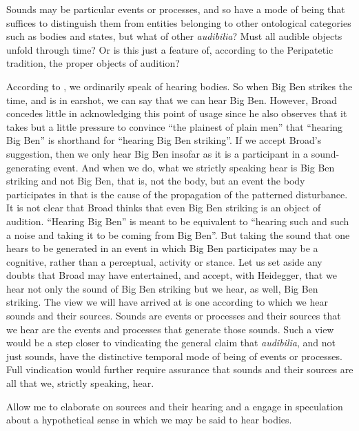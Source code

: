 Sounds may be particular events or processes, and so have a mode of being that suffices to distinguish them from entities belonging to other ontological categories such as bodies and states, but what of other \emph{audibilia}? Must all audible objects unfold through time? Or is this just a feature of, according to the Peripatetic tradition, the proper objects of audition? 

According to \citet[4]{Broad:1952kx}, we ordinarily speak of hearing bodies. So when Big Ben strikes the time, and is in earshot, we can say that we can hear Big Ben. However, Broad concedes little in acknowledging this point of usage since he also observes that it takes but a little pressure to convince ``the plainest of plain men'' that ``hearing Big Ben'' is shorthand for ``hearing Big Ben striking''. If we accept Broad's suggestion, then we only hear Big Ben insofar as it is a participant in a sound-generating event. And when we do, what we strictly speaking hear is Big Ben striking and not Big Ben, that is, not the body, but an event the body participates in that is the cause of the propagation of the patterned disturbance. It is not clear that Broad thinks that even Big Ben striking is an object of audition. ``Hearing Big Ben'' is meant to be equivalent to ``hearing such and such a noise and taking it to be coming from Big Ben''. But taking the sound that one hears to be generated in an event in which Big Ben participates may be a cognitive, rather than a perceptual, activity or stance. Let us set aside any doubts that Broad may have entertained, and accept, with Heidegger, that we hear not only the sound of Big Ben striking but we hear, as well, Big Ben striking. The view we will have arrived at is one according to which we hear sounds and their sources. Sounds are events or processes and their sources that we hear are the events and processes that generate those sounds. Such a view would be a step closer to vindicating the general claim that \emph{audibilia}, and not just sounds, have the distinctive temporal mode of being of events or processes. Full vindication would further require assurance that sounds and their sources are all that we, strictly speaking, hear.

Allow me to elaborate on sources and their hearing and a engage in speculation about a hypothetical sense in which we may be said to hear bodies.

